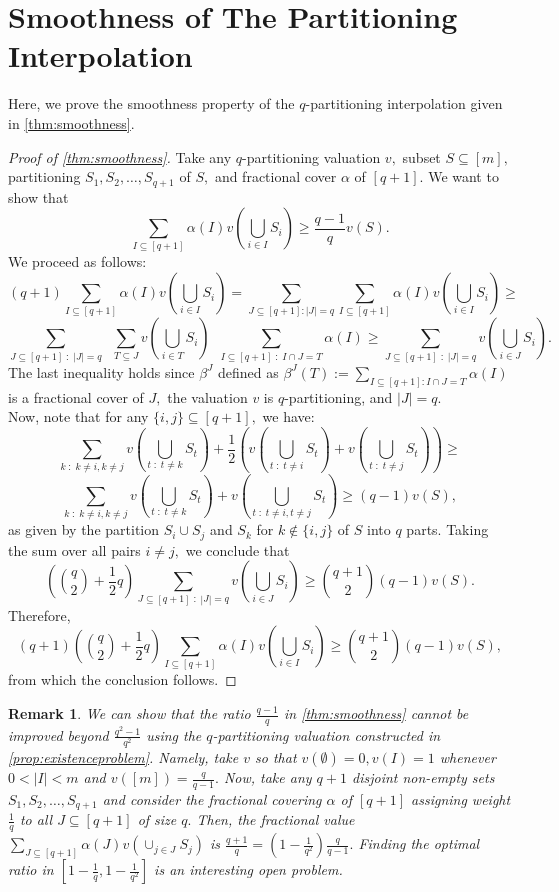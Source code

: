 \documentclass[11pt]{article}%
\newtheorem{remark}[theorem]{Remark}
\numberwithin{theorem}{subsection}
\begin{document}
\section{Smoothness of The Partitioning Interpolation}
\label{section:properties}
Here, we prove the smoothness property of the $q$-partitioning interpolation given in \cref{thm:smoothness}. 

\begin{proof}[Proof of \cref{thm:smoothness}]
Take any $q$-partitioning valuation $v,$ subset $S\subseteq [m],$ partitioning $S_1, S_2, \ldots, S_{q+1}$ of $S,$ and fractional cover $\alpha$ of $[q+1].$ We want to show that 
$$
\sum_{I\subseteq [q+1]} \alpha(I)
v(\bigcup_{i\in I}S_i)\ge 
\frac{q-1}{q}v(S).
$$
We proceed as follows:
$$
(q+1)\sum_{I\subseteq [q+1]} \alpha(I)
v(\bigcup_{i\in I}S_i) = 
\sum_{J \subseteq [q+1] : |J| = q}
\sum_{I\subseteq [q+1]} \alpha(I)
v(\bigcup_{i\in I}S_i) \ge 
$$
$$
\sum_{J \subseteq [q+1]\; : \; |J| = q}\; \;
\sum_{T \subseteq J} v(\bigcup_{i \in T}S_i)\; \; 
\sum_{I \subseteq [q+1]\; : \;I\cap J = T} \alpha (I) \ge
\sum_{J \subseteq [q+1]\; : \;|J| = q}
v(\bigcup_{i \in J}S_i).
$$
The last inequality holds
since $\beta^J$ defined as $\beta^J(T):= \sum_{I \subseteq [q+1] : I\cap J = T} \alpha (I)$ is a fractional cover of $J,$ the valuation $v$ is $q$-partitioning, 
and $|J| = q.$\\

\noindent
Now, note that for any $\{i,j\}\subseteq [q+1],$ we have:
$$
\sum_{k\; : \; k \neq i, k \neq j}v(\bigcup_{t\; : \;t\neq k}S_t) + 
\frac{1}{2}( v(\bigcup_{t\; : \;t\neq i}S_t) + 
v(\bigcup_{t\; : \;t\neq j}S_t))\ge 
$$
$$
\sum_{k\; : \;k \neq i, k \neq j}v(\bigcup_{t\; : \;t\neq k}S_t)  + v(\bigcup_{t\; : \;t\neq i, t\neq j}S_t)\ge 
(q-1)v(S),
$$
as given by the partition $S_i\cup S_j$ and $S_k$ for $k\not \in \{i,j\}$ of $S$ into $q$ parts. Taking the sum over all pairs $i\neq j,$ we conclude that 
$$
\left(\binom{q}{2} + \frac{1}{2}q\right)\sum_{J \subseteq [q+1]\; : \;|J| = q}
v(\bigcup_{i \in J}S_i) \ge 
\binom{q+1}{2}(q-1)v(S).
$$
Therefore, 
$$
(q+1)\left(\binom{q}{2} + \frac{1}{2}q\right)\sum_{I\subseteq [q+1]} \alpha(I)
v(\bigcup_{i\in I}S_i)\ge 
\binom{q+1}{2}(q-1)v(S),
$$
from which the conclusion follows.
\end{proof}

\begin{remark}
\label{remark:closenessgap}
\normalfont
We can show that the ratio $\frac{q-1}{q}$ in \cref{thm:smoothness} cannot be improved beyond $ \frac{q^2 - 1}{q^2}$ using
the $q$-partitioning valuation constructed in \cref{prop:existenceproblem}. Namely, take $v$ so that $v(\emptyset) =0,
v(I) = 1$ whenever $0 <|I|<m$ and $v([m]) =\frac{q}{q-1}.$ Now, take any $q+1$ disjoint non-empty sets $S_1, S_2, \ldots, S_{q+1}$ and consider the fractional covering $\alpha$ of $[q+1]$
assigning weight $\frac{1}{q}$ to all $J\subseteq [q+1]$ of  size $q.$ Then, the fractional value 
$\displaystyle \sum_{J \subseteq [q+1]}\alpha(J)v(\cup_{j \in J}S_j)$
is $\frac{q+1}{q} = (1 - \frac{1}{q^2})\frac{q}{q-1}.$ Finding the optimal ratio in $[1 - \frac{1}{q}, 1 - \frac{1}{q^2}]$ is an interesting open problem.
\end{remark}
\end{document}

